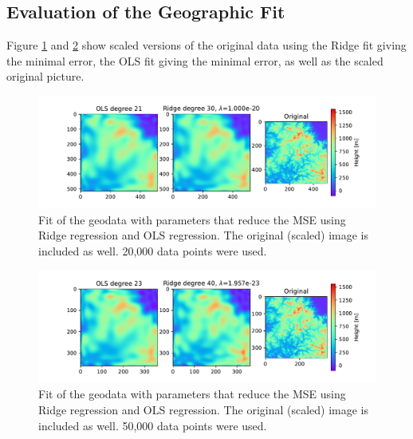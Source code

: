 \documentclass[11pt,a4paper,titlepage]{article}
\begin{document}
\subsection{Evaluation of the Geographic Fit}
Figure \ref{fig:Korea_plot} and \ref{fig:Korea_plot_XXL} show scaled versions of the original data using the Ridge fit giving the minimal error, the OLS fit giving the minimal error, as well as the scaled original picture.
\begin{figure}[H]
\centering
\includegraphics[width=1.0\textwidth]{Fitted_images.pdf}
\caption[Fitted geodata with 20000 points]{Fit of the geodata with parameters that reduce the MSE using Ridge regression and OLS regression. The original (scaled) image is included as well. 20,000 data points were used.}
\label{fig:Korea_plot}
\end{figure}
\begin{figure}[H]
\centering
\includegraphics[width=1.0\textwidth]{figures/presentable_data/Fitted_imagesKorea50000_NOBOOTSTRAP.pdf}
\caption[Fitted geodata with 50000 points]{Fit of the geodata with parameters that reduce the MSE using Ridge regression and OLS regression. The original (scaled) image is included as well. 50,000 data points were used.}
\label{fig:Korea_plot_XXL}
\end{figure}
\end{document}
